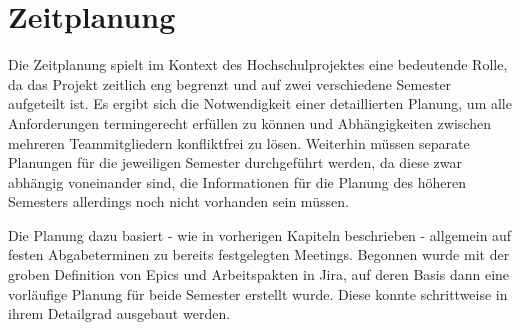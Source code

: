 \chapter{Zeitplanung}
Die Zeitplanung spielt im Kontext des Hochschulprojektes eine bedeutende Rolle,
da das Projekt zeitlich eng begrenzt und auf zwei verschiedene Semester aufgeteilt ist.
Es ergibt sich die Notwendigkeit einer detaillierten Planung, um alle Anforderungen
termingerecht erfüllen zu können und Abhängigkeiten zwischen mehreren Teammitgliedern
konfliktfrei zu lösen. Weiterhin müssen separate Planungen für die jeweiligen Semester
durchgeführt werden, da diese zwar abhängig voneinander sind, die Informationen für die
Planung des höheren Semesters allerdings noch nicht vorhanden sein müssen.

Die Planung dazu basiert - wie in vorherigen Kapiteln beschrieben - allgemein auf
festen Abgabeterminen zu bereits festgelegten Meetings. 
Begonnen wurde mit der groben Definition von Epics
und Arbeitspakten in Jira, auf deren Basis dann eine vorläufige Planung für beide Semester
erstellt wurde. Diese konnte schrittweise in ihrem Detailgrad ausgebaut werden.

